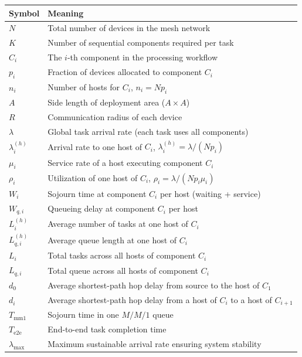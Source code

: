 \documentclass[12pt,a4paper]{article}
\begin{document}
\begin{table}[h!]
\centering
\begin{tabular}{ll}
\hline
Symbol & Meaning \\
\hline
$N$ & Total number of devices in the mesh network \\
$K$ & Number of sequential components required per task \\
$C_i$ & The $i$-th component in the processing workflow \\
$p_i$ & Fraction of devices allocated to component $C_i$ \\
$n_i$ & Number of hosts for $C_i$, $n_i = Np_i$ \\
$A$ & Side length of deployment area ($A \times A$) \\
$R$ & Communication radius of each device \\
$\lambda$ & Global task arrival rate (each task uses all components) \\
$\lambda_i^{(h)}$ & Arrival rate to one host of $C_i$, $\lambda_i^{(h)}=\lambda/(Np_i)$ \\
$\mu_i$ & Service rate of a host executing component $C_i$ \\
$\rho_i$ & Utilization of one host of $C_i$, $\rho_i=\lambda/(Np_i\mu_i)$ \\
$W_i$ & Sojourn time at component $C_i$ per host (waiting + service) \\
$W_{q,i}$ & Queueing delay at component $C_i$ per host \\
$L_i^{(h)}$ & Average number of tasks at one host of $C_i$ \\
$L_{q,i}^{(h)}$ & Average queue length at one host of $C_i$ \\
$L_i$ & Total tasks across all hosts of component $C_i$ \\
$L_{q,i}$ & Total queue across all hosts of component $C_i$ \\
$d_0$ & Average shortest-path hop delay from source to the host of $C_1$ \\
$d_i$ & Average shortest-path hop delay from a host of $C_i$ to a host of $C_{i+1}$ \\
$T_{\text{mm1}}$ & Sojourn time in one $M/M/1$ queue \\
$T_{\text{e2e}}$ & End-to-end task completion time \\
$\lambda_{\max}$ & Maximum sustainable arrival rate ensuring system stability \\
\hline
\end{tabular}
\end{table}
\end{document}
